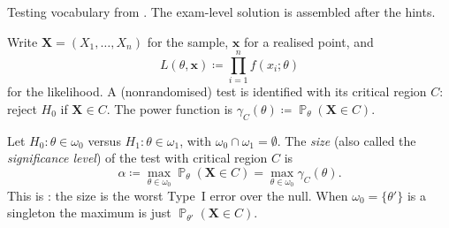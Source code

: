 \documentclass[11pt,a4paper]{article}
\DeclareMathOperator{\Pbb}{\mathbb{P}}
\begin{document}
Testing vocabulary from \citep[\S8.1--\S8.2]{hogg2019}. The exam-level solution is assembled after the hints.

Write \(\mathbf{X}=(X_1,\dots,X_n)\) for the sample, \(\mathbf{x}\) for a realised point, and
\[
L(\theta,\mathbf{x})
\coloneqq
\prod_{i=1}^{n} f(x_i;\theta)
\]
for the likelihood. A (nonrandomised) test is identified with its critical region \(C\): reject \(H_0\) if \(\mathbf{X}\in C\). The power function is \(\gamma_C(\theta)\coloneqq\Pbb_{\theta}(\mathbf{X}\in C)\).

\begin{definition}
\label{def:test-size}
Let \(H_0:\theta\in\omega_0\) versus \(H_1:\theta\in\omega_1\), with \(\omega_0\cap\omega_1=\emptyset\). The \emph{size} (also called the \emph{significance level}) of the test with critical region \(C\) is
\[
\alpha
\coloneqq
\max_{\theta\in\omega_0}\Pbb_{\theta}(\mathbf{X}\in C)
=
\max_{\theta\in\omega_0}\gamma_C(\theta).
\]
This is \citep[(8.1.3)]{hogg2019}: the size is the worst Type~I error over the null. When \(\omega_0=\{\theta'\}\) is a singleton the maximum is just \(\Pbb_{\theta'}(\mathbf{X}\in C)\).
\end{definition}
\end{document}

